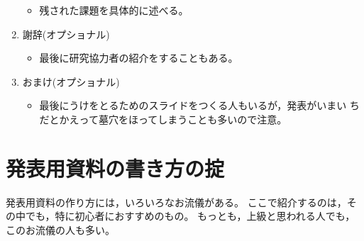 \documentclass[12pt, ]{jsarticle}
\providecommand{\tightlist}{%
   \setlength{\itemsep}{0pt}\setlength{\parskip}{0pt}}
\begin{document}
\begin{enumerate}
  \begin{itemize}
  \tightlist
  \item
    残された課題を具体的に述べる。
  \end{itemize}
\item
  謝辞(オプショナル)

  \begin{itemize}
  \tightlist
  \item
    最後に研究協力者の紹介をすることもある。
  \end{itemize}
\item
  おまけ(オプショナル)

  \begin{itemize}
  \tightlist
  \item
    最後にうけをとるためのスライドをつくる人もいるが，発表がいまい
    ちだとかえって墓穴をほってしまうことも多いので注意。
  \end{itemize}
\end{enumerate}

\hypertarget{ux767aux8868ux7528ux8cc7ux6599ux306eux66f8ux304dux65b9ux306eux639f}{%
\section{発表用資料の書き方の掟}\label{ux767aux8868ux7528ux8cc7ux6599ux306eux66f8ux304dux65b9ux306eux639f}}

発表用資料の作り方には，いろいろなお流儀がある。
ここで紹介するのは，その中でも，特に初心者におすすめのもの。
もっとも，上級と思われる人でも，このお流儀の人も多い。
\end{document}
